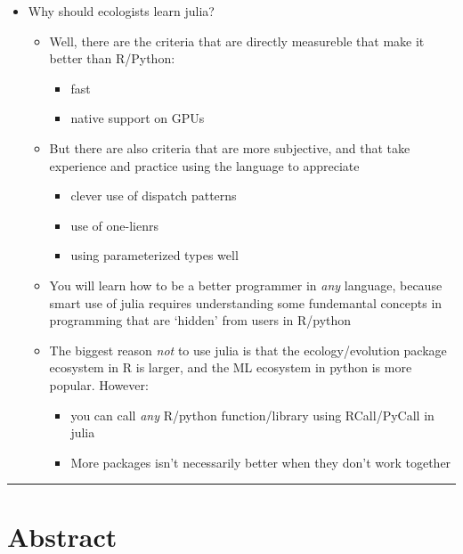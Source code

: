 \documentclass[11pt]{article}
\begin{document}
\begin{itemize}
\tightlist
\item
  Why should ecologists learn julia?

  \begin{itemize}
  \tightlist
  \item
    Well, there are the criteria that are directly measureble that make
    it better than R/Python:

    \begin{itemize}
    \tightlist
    \item
      fast
    \item
      native support on GPUs
    \end{itemize}
  \item
    But there are also criteria that are more subjective, and that take
    experience and practice using the language to appreciate

    \begin{itemize}
    \tightlist
    \item
      clever use of dispatch patterns
    \item
      use of one-lienrs
    \item
      using parameterized types well
    \end{itemize}
  \item
    You will learn how to be a better programmer in \emph{any} language,
    because smart use of julia requires understanding some fundemantal
    concepts in programming that are `hidden' from users in R/python
  \item
    The biggest reason \emph{not} to use julia is that the
    ecology/evolution package ecosystem in R is larger, and the ML
    ecosystem in python is more popular. However:

    \begin{itemize}
    \tightlist
    \item
      you can call \emph{any} R/python function/library using
      RCall/PyCall in julia
    \item
      More packages isn't necessarily better when they don't work
      together
    \end{itemize}
  \end{itemize}
\end{itemize}

\begin{center}\rule{0.5\linewidth}{0.5pt}\end{center}

\hypertarget{abstract}{%
\section{Abstract}\label{abstract}}
\end{document}
